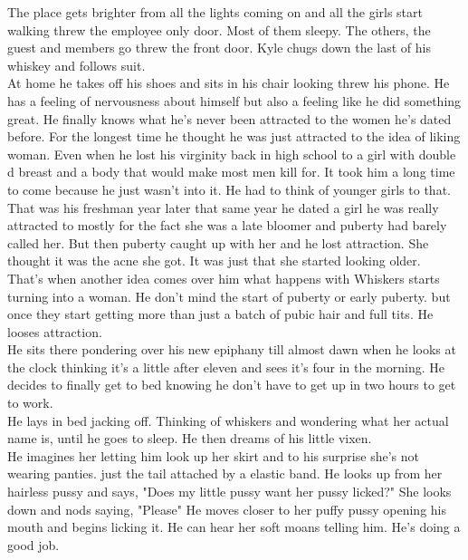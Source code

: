 \documentclass {article}[12pt]
\begin{document}
The place gets brighter from all the lights coming on and all the girls start walking threw the employee only door. Most of them sleepy. The others, the guest and members go threw the front door. Kyle chugs down the last of his whiskey and follows suit.\\

At home he takes off his shoes and sits in his chair looking threw his phone. He has a feeling of nervousness about himself but also a feeling like he did something great. He finally knows what he's never been attracted to the women he's dated before. For the longest time he thought he was just attracted to the idea of liking woman. Even when he lost his virginity back in high school to a girl with double d breast and a body that would make most men kill for. It took him a long time to come because he just wasn't into it. He had to think of younger girls to that. \\

That was his freshman year later that same year he dated a girl he was really attracted to mostly for the fact she was a late bloomer and puberty had barely called her. But then puberty caught up with her and he lost attraction. She thought it was the acne she got. It was just that she started looking older. \\

That's when another idea comes over him what happens with Whiskers starts turning into a woman. He don't mind the start of puberty or early puberty. but once they start getting more than just a batch of pubic hair and full tits. He looses attraction.\\

He sits there pondering over his new epiphany till almost dawn when he looks at the clock thinking it's a little after eleven and sees it's four in the morning. He decides to finally get to bed knowing he don't have to get up in two hours to get to work.\\

He lays in bed jacking off. Thinking of whiskers and wondering what her actual name is, until he goes to sleep. He then dreams of his little vixen.\\

He imagines her letting him look up her skirt and to his surprise she's not wearing panties. just the tail attached by a elastic band. He looks up from her hairless pussy and says, "Does my little pussy want her pussy licked?" She looks down and nods saying, "Please" He moves closer to her puffy pussy opening his mouth and begins licking it. He can hear her soft moans telling him. He's doing a good job.\\ 
\end{document}
